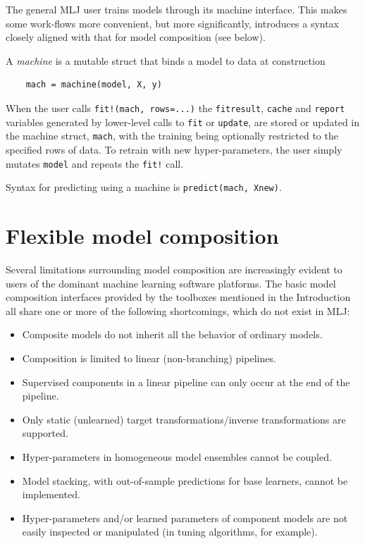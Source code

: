 \documentclass{article}
\begin{document}
The general MLJ user trains models through its machine interface. This makes some work-flows more convenient, but more significantly, introduces a syntax closely aligned with that for model composition (see below).

A \textit{machine} is a mutable struct that binds a model to data at construction

\begin{verbatim}
    mach = machine(model, X, y)    
\end{verbatim}

When the user calls \texttt{fit!(mach, rows=...)} the \texttt{fitresult}, \texttt{cache} and \texttt{report} variables generated by lower-level calls to \texttt{fit} or \texttt{update}, are stored or updated in the machine struct, \texttt{mach}, with the training being optionally restricted to the specified rows of data. To retrain with new hyper-parameters, the user simply mutates
\texttt{model} and repeats the \texttt{fit!} call.

Syntax for predicting using a machine is \texttt{predict(mach, Xnew)}.

\section{Flexible model composition}

Several limitations surrounding model composition are increasingly evident to users of the dominant machine learning software platforms. The basic model composition interfaces provided by the toolboxes mentioned in the Introduction all share one or more of the following shortcomings, which do not exist in MLJ:

\begin{itemize}
    \item Composite models do not inherit all the behavior of ordinary models.
  \item Composition is limited to linear (non-branching) pipelines.
  \item Supervised components in a linear pipeline can only occur at the end of the pipeline.
  \item Only static (unlearned) target transformations/inverse transformations are supported.
  \item Hyper-parameters in homogeneous model ensembles cannot be coupled.
  \item Model stacking, with out-of-sample predictions for base learners, cannot be implemented.
  \item Hyper-parameters and/or learned parameters of component models are not easily inspected or manipulated (in tuning algorithms, for example).
\end{itemize}
\end{document}
